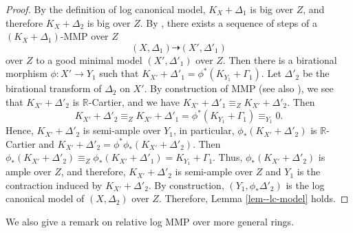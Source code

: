 \documentclass[12pt,twoside]{amsart}
\theoremstyle{definition}
\begin{document}
\begin{proof}
By the definition of log canonical model, $K_{X}+\Delta_{1}$ is big over $Z$, and therefore $K_{X}+\Delta_{2}$ is big over $Z$. 
By \cite[Theorem 1.7]{hashizumehu}, there exists a sequence of steps of a $(K_{X}+\Delta_{1})$-MMP over $Z$
$$(X,\Delta_{1})\dashrightarrow (X',\Delta'_{1})$$
over $Z$ to a good minimal model $(X',\Delta'_{1})$ over $Z$. 
Then there is a birational morphism $\phi \colon X' \to Y_{1}$ such that $K_{X'}+\Delta'_{1}=\phi^{*}(K_{Y_{1}}+\Gamma_{1})$. 
Let $\Delta'_{2}$ be the birational transform of $\Delta_{2}$ on $X'$. 
By construction of MMP (see also \cite[Remark 6.1 (2)]{hashizumehu}), we see that $K_{X'}+\Delta'_{2}$ is $\mathbb{R}$-Cartier, and we have $K_{X'}+\Delta'_{1} \equiv_{Z} K_{X'}+\Delta'_{2}$. 
Then 
$$K_{X'}+\Delta'_{2}\equiv_{Z}K_{X'}+\Delta'_{1}=\phi^{*}(K_{Y_{1}}+\Gamma_{1})\equiv_{Y_{1}}0.$$
Hence, $K_{X'}+\Delta'_{2}$ is semi-ample over $Y_{1}$, in particular, $\phi_{*}(K_{X'}+\Delta'_{2})$ is $\mathbb{R}$-Cartier and $K_{X'}+\Delta'_{2}=\phi^{*}\phi_{*}(K_{X'}+\Delta'_{2})$. 
Then $\phi_{*}(K_{X'}+\Delta'_{2})\equiv_{Z}\phi_{*}(K_{X'}+\Delta'_{1})=K_{Y_{1}}+\Gamma_{1}$. 
Thus, $\phi_{*}(K_{X'}+\Delta'_{2})$ is ample over $Z$, and therefore, $K_{X'}+\Delta'_{2}$ is semi-ample over $Z$ and $Y_{1}$ is the contraction induced by $K_{X'}+\Delta'_{2}$. 
By construction, $(Y_{1},\phi_{*}\Delta'_{2})$ is the log canonical model of $(X,\Delta_{2})$ over $Z$. 
Therefore, Lemma \ref{lem--lc-model} holds. 
\end{proof}


We also give a remark on relative log MMP over more general rings.
\end{document}
